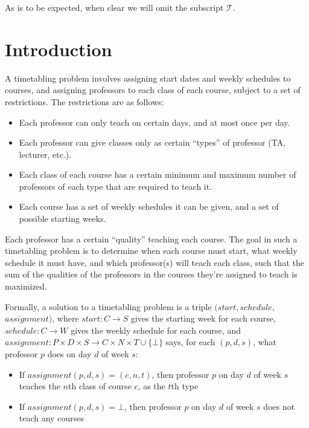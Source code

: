 As is to be expected, when clear we will omit the subscript $\mathcal{T}$.

\section{Introduction}

A timetabling problem involves assigning start dates and weekly schedules to courses, and assigning professors to each class of each course, subject to a set of restrictions. The restrictions are as follows:

\begin{itemize}
\item Each professor can only teach on certain days, and at most once per day.
\item Each professor can give classes only as certain ``types'' of professor (TA, lecturer, etc.).
\item Each class of each course has a certain minimum and maximum number of professors of each type that are required to teach it.
\item Each course has a set of weekly schedules it can be given, and a set of possible starting weeks.
\end{itemize}

Each professor has a certain ``quality'' teaching each course. The goal in such a timetabling problem is to determine when each course must start, what weekly schedule it must have, and which professor(s) will teach each class, such that the sum of the qualities of the professors in the courses they're assigned to teach is maximized.



Formally, a solution to a timetabling problem is a triple $(start, schedule,$ $assignment)$, where $start: C \to S$ gives the starting week for each course, $schedule: C \to W$ gives the weekly schedule for each course, and $assignment: P \times D \times S \to C \times N \times T \cup \{\bot\}$ says, for each $(p, d, s)$, what professor $p$ does on day $d$ of week $s$:
\begin{itemize}
\item If $assignment(p, d, s) = (c, n, t)$, then professor $p$ on day $d$ of week $s$ teaches the $n$th class of course $c$, as the $t$th type
\item If $assignment(p, d, s) = \bot$, then professor $p$ on day $d$ of week $s$ does not teach any courses
\end{itemize}
